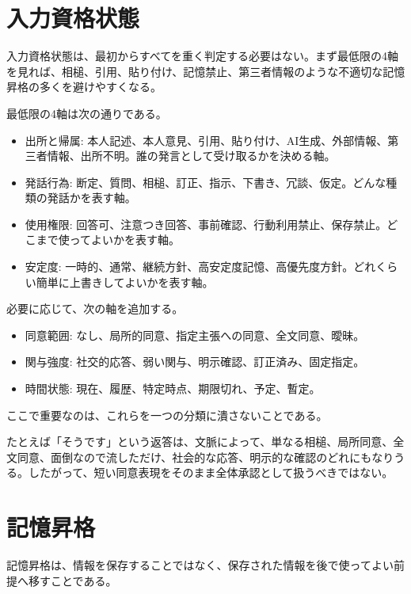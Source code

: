 \documentclass[12pt,a4paper]{article}
\begin{document}
\section{入力資格状態}\label{ux5165ux529bux8cc7ux683cux72b6ux614b}

入力資格状態は、最初からすべてを重く判定する必要はない。まず最低限の4軸を見れば、相槌、引用、貼り付け、記憶禁止、第三者情報のような不適切な記憶昇格の多くを避けやすくなる。

最低限の4軸は次の通りである。

\begin{itemize}
\tightlist
\item
  出所と帰属: 本人記述、本人意見、引用、貼り付け、AI生成、外部情報、第三者情報、出所不明。誰の発言として受け取るかを決める軸。
\item
  発話行為: 断定、質問、相槌、訂正、指示、下書き、冗談、仮定。どんな種類の発話かを表す軸。
\item
  使用権限: 回答可、注意つき回答、事前確認、行動利用禁止、保存禁止。どこまで使ってよいかを表す軸。
\item
  安定度: 一時的、通常、継続方針、高安定度記憶、高優先度方針。どれくらい簡単に上書きしてよいかを表す軸。
\end{itemize}

必要に応じて、次の軸を追加する。

\begin{itemize}
\tightlist
\item
  同意範囲: なし、局所的同意、指定主張への同意、全文同意、曖昧。
\item
  関与強度: 社交的応答、弱い関与、明示確認、訂正済み、固定指定。
\item
  時間状態: 現在、履歴、特定時点、期限切れ、予定、暫定。
\end{itemize}

ここで重要なのは、これらを一つの分類に潰さないことである。

たとえば「そうです」という返答は、文脈によって、単なる相槌、局所同意、全文同意、面倒なので流しただけ、社会的な応答、明示的な確認のどれにもなりうる。したがって、短い同意表現をそのまま全体承認として扱うべきではない。

\section{記憶昇格}\label{ux8a18ux61b6ux6607ux683c}

記憶昇格は、情報を保存することではなく、保存された情報を後で使ってよい前提へ移すことである。
\end{document}
